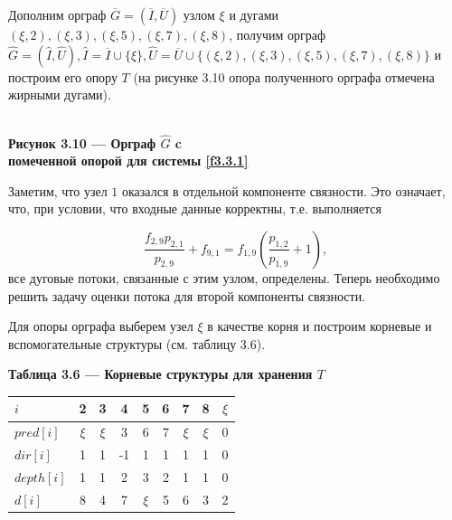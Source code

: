 \documentclass[14pt]{extarticle}%
\begin{document}
Дополним орграф $\overline{G}=(\overline{I},\overline{U})$ узлом $\xi$ и дугами $(\xi,2), (\xi,3),(\xi,5), (\xi,7), (\xi,8)$, получим орграф $\widehat{G}=(\widehat{I}, \widehat{U}), \widehat{I}=\overline{I}\cup \{\xi\}, \widehat{U}=\overline{U}\cup \{(\xi,2), (\xi,3),(\xi,5), (\xi,7), (\xi,8)\}$ и построим его опору $T$ (на рисунке 3.10 опора полученного орграфа отмечена жирными дугами).

\begin{center}
\\
\textbf{Рисунок 3.10 --- Орграф $\widehat{G}$ c\\помеченной опорой для системы \eqref{f3.3.1}}
\end{center}

Заметим, что узел $1$ оказался в отдельной компоненте связности. Это означает, что, при условии, что входные данные корректны, т.е. выполняется

$$
\frac{f_{2,9} p_{2,1}}{p_{2,9}}+f_{9,1}=f_{1,9} \left(\frac{p_{1,2}}{p_{1,9}}+1\right),
$$
все дуговые потоки, связанные с этим узлом, определены. Теперь необходимо решить задачу оценки потока для второй компоненты связности.

Для опоры орграфа выберем узел $\xi$ в качестве корня и построим корневые и вспомогательные структуры (см. таблицу 3.6).

\begin{center}
\textbf{Таблица 3.6 --- Корневые структуры для хранения $T$}\\
\begin{tabular}{l|cccccccc}
 $i$ &2&3&4&5&6&7&8&$\xi$\\\hline
 $pred[i]$ & $\xi$ & $\xi$ & 3 & 6 & 7 & $\xi$ & $\xi$ & 0 \\
 $dir[i]$ & 1 & 1 & -1 & 1 & 1 & 1 & 1 & 0 \\
 $depth[i]$ & 1 & 1 & 2 & 3 & 2 & 1 & 1 & 0 \\
 $d[i]$ & 8 & 4 & 7 & $\xi$ & 5 & 6 & 3 & 2  \\
\end{tabular}
\end{center}
\end{document}
